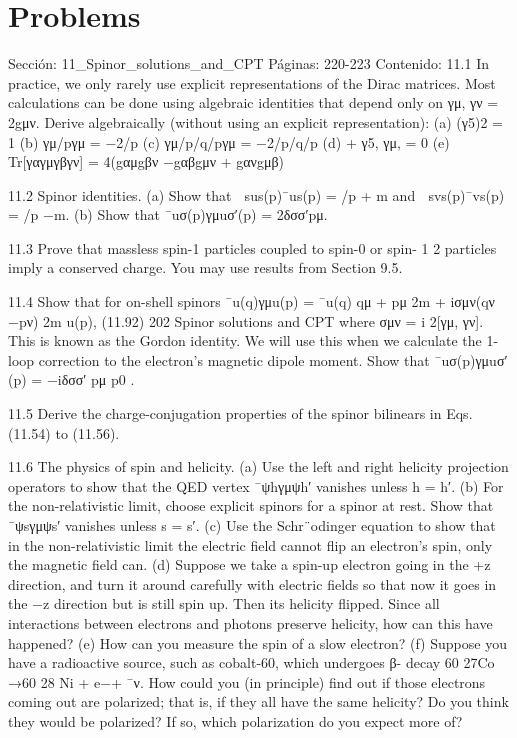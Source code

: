 \section*{Problems}
Sección: 11_Spinor_solutions_and_CPT
Páginas: 220-223
Contenido:
11.1 In practice, we only rarely use explicit representations of the Dirac matrices. Most
calculations can be done using algebraic identities that depend only on {γμ, γν} =
2gμν. Derive algebraically (without using an explicit representation):
(a) (γ5)2 = 1
(b) γμ/pγμ = −2/p
(c) γμ/p/q/pγμ = −2/p/q/p
(d)
+
γ5, γμ,
= 0
(e) Tr[γαγμγβγν] = 4(gαμgβν −gαβgμν + gανgμβ)

11.2 Spinor identities.
(a) Show that 
sus(p)¯us(p) = /p + m and 
svs(p)¯vs(p) = /p −m.
(b) Show that ¯uσ(p)γμuσ′(p) = 2δσσ′pμ.

11.3 Prove that massless spin-1 particles coupled to spin-0 or spin- 1
2 particles imply a
conserved charge. You may use results from Section 9.5.

11.4 Show that for on-shell spinors
¯u(q)γμu(p) = ¯u(q)
qμ + pμ
2m
+ iσμν(qν −pν)
2m
u(p),
(11.92)
202
Spinor solutions and CPT
where σμν =
i
2[γμ, γν]. This is known as the Gordon identity. We will use this
when we calculate the 1-loop correction to the electron’s magnetic dipole moment.
Show that ¯uσ(p)γμuσ′ (p) = −iδσσ′ pμ
p0 .

11.5 Derive the charge-conjugation properties of the spinor bilinears in Eqs. (11.54) to
(11.56).

11.6 The physics of spin and helicity.
(a) Use the left and right helicity projection operators to show that the QED vertex
¯ψhγμψh′ vanishes unless h = h′.
(b) For the non-relativistic limit, choose explicit spinors for a spinor at rest. Show
that ¯ψsγμψs′ vanishes unless s = s′.
(c) Use the Schr¨odinger equation to show that in the non-relativistic limit the
electric ﬁeld cannot ﬂip an electron’s spin, only the magnetic ﬁeld can.
(d) Suppose we take a spin-up electron going in the +z direction, and turn it around
carefully with electric ﬁelds so that now it goes in the −z direction but is still
spin up. Then its helicity ﬂipped. Since all interactions between electrons and
photons preserve helicity, how can this have happened?
(e) How can you measure the spin of a slow electron?
(f) Suppose you have a radioactive source, such as cobalt-60, which undergoes β-
decay 60
27Co →60
28 Ni + e−+ ¯ν. How could you (in principle) ﬁnd out if those
electrons coming out are polarized; that is, if they all have the same helicity?
Do you think they would be polarized? If so, which polarization do you expect
more of?

